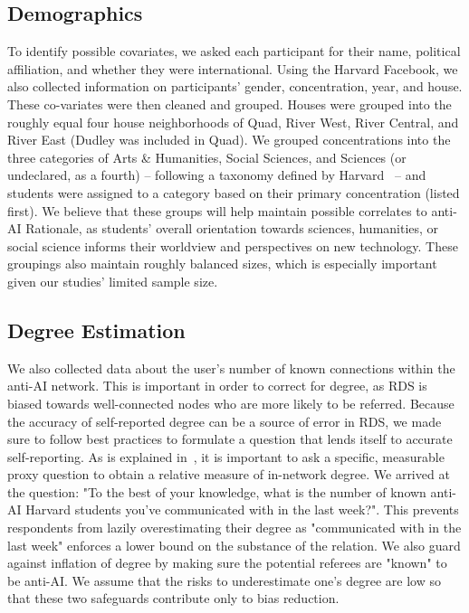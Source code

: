 \documentclass[11pt,a4paper,twocolumn,twoside]{rho-class/rho}
\begin{document}
\subsection{Demographics} 
To identify possible covariates, we asked each participant for their name, political affiliation, and whether they were international. Using the Harvard Facebook, we also collected information on participants' gender, concentration, year, and house. These co-variates were then cleaned and grouped. Houses were grouped into the roughly equal four house neighborhoods of Quad, River West, River Central, and River East (Dudley was included in Quad). We grouped concentrations into the three categories of Arts \& Humanities, Social Sciences, and Sciences (or undeclared, as a fourth) -- following a taxonomy defined by Harvard~\cite{Harvard_College} -- and students were assigned to a category based on their primary concentration (listed first). We believe that these groups will help maintain possible correlates to anti-AI Rationale, as students' overall orientation towards sciences, humanities, or social science informs their worldview and perspectives on new technology. These groupings also maintain roughly balanced sizes, which is especially important given our studies' limited sample size.

\subsection{Degree Estimation}
We also collected data about the user's number of known connections within the anti-AI network. This is important in order to correct for degree, as RDS is biased towards well-connected nodes who are more likely to be referred. Because the accuracy of self-reported degree can be a source of error in RDS, we made sure to follow best practices to formulate a question that lends itself to accurate self-reporting. As is explained in~\cite{mccreesh2012evaluation}, it is important to ask a specific, measurable proxy question to obtain a relative measure of in-network degree. We arrived at the question: "To the best of your knowledge, what is the number of known anti-AI Harvard students you've communicated with in the last week?". This prevents respondents from lazily overestimating their degree as "communicated with in the last week" enforces a lower bound on the substance of the relation. We also guard against inflation of degree by making sure the potential referees are "known" to be anti-AI. We assume that the risks to underestimate one's degree are low so that these two safeguards contribute only to bias reduction.
\end{document}
